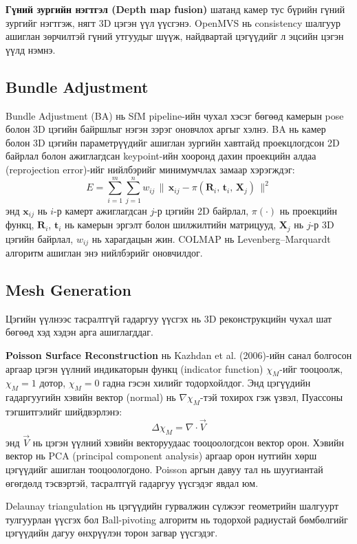 \textbf{Гүний зургийн нэгтгэл (Depth map fusion)} шатанд камер тус бүрийн гүний зургийг нэгтгэж, нягт 3D цэгэн үүл үүсгэнэ. OpenMVS нь consistency шалгуур ашиглан зөрчилтэй гүний утгуудыг шүүж, найдвартай цэгүүдийг л эцсийн цэгэн үүлд нэмнэ.

\subsection{Bundle Adjustment}

Bundle Adjustment (BA) нь SfM pipeline-ийн чухал хэсэг бөгөөд камерын pose болон 3D цэгийн байршлыг нэгэн зэрэг оновчлох аргыг хэлнэ. BA нь камер болон 3D цэгийн параметрүүдийг ашиглан зургийн хавтгайд проекцлогдсон 2D байрлал болон ажиглагдсан keypoint-ийн хооронд дахин проекцийн алдаа (reprojection error)-ийг нийлбэрийг минимумчлах замаар хэрэгждэг:
\[
    E = \sum_{i=1}^{m}\sum_{j=1}^{n} w_{ij}\,\bigl\|\,\mathbf{x}_{ij} - \pi(\mathbf{R}_i,\,\mathbf{t}_i,\,\mathbf{X}_j)\,\bigr\|^2
\]
энд $\mathbf{x}_{ij}$ нь $i$-р камерт ажиглагдсан $j$-р цэгийн 2D байрлал, $\pi(\cdot)$ нь проекцийн функц, $\mathbf{R}_i$, $\mathbf{t}_i$ нь камерын эргэлт болон шилжилтийн матрицууд, $\mathbf{X}_j$ нь $j$-р 3D цэгийн байрлал, $w_{ij}$ нь харагдацын жин. COLMAP нь Levenberg–Marquardt алгоритм ашиглан энэ нийлбэрийг оновчилдог.

\subsection{Mesh Generation}

Цэгийн үүлнээс тасралтгүй гадаргуу үүсгэх нь 3D реконструкцийн чухал шат бөгөөд хэд хэдэн арга ашиглагддаг.

\textbf{Poisson Surface Reconstruction} нь Kazhdan et al. (2006)-ийн санал болгосон аргаар цэгэн үүлний индикаторын функц (indicator function) $\chi_M$-ийг тооцоолж, $\chi_M = 1$ дотор, $\chi_M = 0$ гадна гэсэн хилийг тодорхойлдог. Энд цэгүүдийн гадаргуугийн хэвийн вектор (normal) нь $\nabla\chi_M$-тэй тохирох гэж үзвэл, Пуассоны тэгшитгэлийг шийдвэрлэнэ:
\[
    \Delta \chi_M = \nabla \cdot \vec{V}
\]
энд $\vec{V}$ нь цэгэн үүлний хэвийн векторуудаас тооцоологдсон вектор орон. Хэвийн вектор нь PCA (principal component analysis) аргаар орон нутгийн хөрш цэгүүдийг ашиглан тооцоологдоно. Poisson аргын давуу тал нь шуугиантай өгөгдөлд тэсвэртэй, тасралтгүй гадаргуу үүсгэдэг явдал юм.

Delaunay triangulation нь цэгүүдийн гурвалжин сүлжээг геометрийн шалгуурт тулгуурлан үүсгэх бол Ball-pivoting алгоритм нь тодорхой радиустай бөмбөлгийг цэгүүдийн дагуу өнхрүүлэн торон загвар үүсгэдэг.

